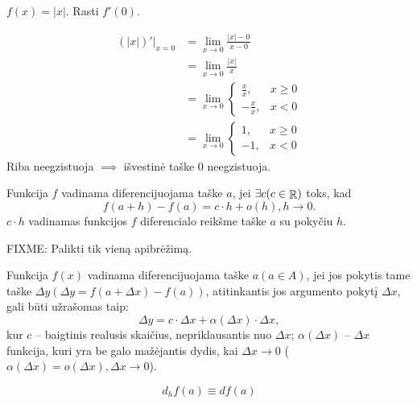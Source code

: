 \begin{exmp}
  $f(x) = |x|$. Rasti $f'(0)$.

  \begin{align*}
    (|x|)'|_{x = 0} 
    &= \lim_{x \to 0} \frac{|x| - 0}{x - 0} \\
    &= \lim_{x \to 0} \frac{|x|}{x} \\
    &= \lim_{x \to 0}
    \begin{cases}
      \frac{x}{x}, & x \geq 0 \\
      -\frac{x}{x}, & x < 0
    \end{cases} \\
    &= \lim_{x \to 0}
    \begin{cases}
      1, & x \geq 0 \\
      -1, & x < 0
    \end{cases}
  \end{align*}
  Riba neegzistuoja $\implies$ išvestinė taške 0 neegzistuoja.
\end{exmp}

\begin{defn}
  Funkcija $f$ vadinama diferencijuojama taške $a$, jei 
  $\exists c (c \in \mathop{\mathbb{R}})$ toks, kad 
  \begin{equation*}
    f(a + h) - f(a) = c \cdot h + o(h), h \to 0.
  \end{equation*}
  $c \cdot h$ vadinamas funkcijos $f$ diferencialo reikšme taške $a$
  su pokyčiu $h$.
\end{defn}

\begin{defn}
  FIXME: Palikti tik vieną apibrėžimą.

  Funkcija $f(x)$ vadinama diferencijuojama taške $a (a \in A)$, jei 
  jos pokytis tame taške $\Delta y (\Delta y = f(a + \Delta x) - f(a))$, 
  atitinkantis jos argumento pokytį $\Delta x$, gali būti užrašomas taip:
  \begin{equation*}
    \Delta y = c \cdot \Delta x + \alpha (\Delta x) \cdot \Delta x,
  \end{equation*}
  kur $c$ – baigtinis realusis skaičius, nepriklausantis nuo $\Delta x$;
  $\alpha(\Delta x)$ – $\Delta x$ funkcija, kuri yra be galo mažėjantis
  dydis, kai $\Delta x \to 0$ 
  ($\alpha(\Delta x) = o(\Delta x), \Delta x \to 0$).
\end{defn}

\begin{notation}
  \begin{equation*}
    d_{h} f(a) \equiv d f(a)
  \end{equation*}
\end{notation}

